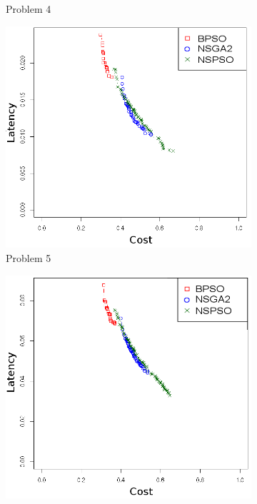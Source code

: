 \begin{figure}[t]
\begin{subfigure}{0.30\textwidth}
	   \caption{Problem 4}
   \end{subfigure}
      \begin{subfigure}{0.30\textwidth}
       \includegraphics[width=\textwidth]{pics/nsgabpso5.png}
	   \caption{Problem 5}
   \end{subfigure}
   \begin{subfigure}{0.30\textwidth}
       \includegraphics[width=\textwidth]{pics/nsgabpso6.png}

\end{subfigure}
\end{figure}
